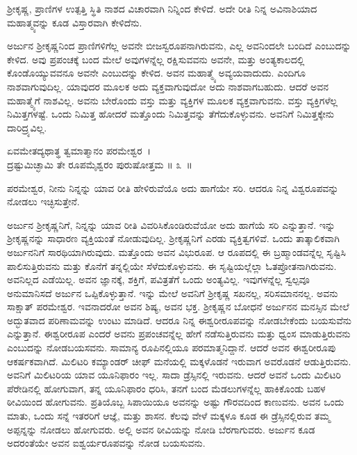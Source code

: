 \begin{artha}
ಶ‍್ರೀಕೃಷ್ಣ, ಪ್ರಾಣಿಗಳ ಉತ್ಪತ್ತಿ ಸ್ಥಿತಿ ನಾಶದ ವಿಚಾರವಾಗಿ ನಿನ್ನಿಂದ ಕೇಳಿದೆ. ಅದೇ ರೀತಿ ನಿನ್ನ ಅವಿನಾಶಿಯಾದ ಮಹಾತ್ಮ್ಯವನ್ನು ಕೂಡ ವಿಸ್ತಾರವಾಗಿ ಕೇಳಿದೆನು.
\end{artha}

ಅರ್ಜುನ ಶ‍್ರೀಕೃಷ್ಣನಿಂದ ಪ್ರಾಣಿಗಳಿಗೆಲ್ಲ ಅವನೇ ಬೀಜಸ್ವರೂಪನಾಗಿರುವನು, ಎಲ್ಲ ಅವನಿಂದಲೇ ಬಂದಿದೆ ಎಂಬುದನ್ನು ಕೇಳಿದ. ಅವು ಪ್ರಪಂಚಕ್ಕೆ ಬಂದ ಮೇಲೆ ಅವುಗಳನ್ನೆಲ್ಲ ರಕ್ಷಿಸುವವನು ಅವನೇ, ಮತ್ತು ಅಂತ್ಯಕಾಲದಲ್ಲಿ ಕೊಂಡೊಯ್ಯುವವನೂ ಅವನೇ ಎಂಬುದನ್ನು ಕೇಳಿದ. ಅವನ ಮಹಾತ್ಮ್ಯೆ ಅವ್ಯಯವಾದುದು. ಎಂದಿಗೂ ನಾಶವಾಗುವುದಿಲ್ಲ. ಯಾವುದರ ಮೂಲಕ ಅದು ವ್ಯಕ್ತವಾಗುವುದೋ ಅದು ನಾಶವಾಗಬಹುದು. ಆದರೆ ಅವನ ಮಹಾತ್ಮ್ಯೆಗೆ ನಾಶವಿಲ್ಲ. ಅವನು ಬೇರೊಂದು ವಸ್ತು ಮತ್ತು ವ್ಯಕ್ತಿಗಳ ಮೂಲಕ ವ್ಯಕ್ತವಾಗುವನು. ವಸ್ತು ವ್ಯಕ್ತಿಗಳೆಲ್ಲ ನಿಮಿತ್ತಗಳಷ್ಟೆ. ಒಂದು ನಿಮಿತ್ತ ಹೋದರೆ ಮತ್ತೊಂದು ನಿಮಿತ್ತವನ್ನು ತೆಗೆದುಕೊಳ್ಳುವನು. ಅವನಿಗೆ ನಿಮಿತ್ತಕ್ಕೇನು ದಾರಿದ್ರ್ಯವಿಲ್ಲ. 

\begin{shloka}
ಏವಮೇತದ್ಯಥಾತ್ಥ ತ್ವಮಾತ್ಮಾನಂ ಪರಮೇಶ್ವರ~।\\ದ್ರಷ್ಟುಮಿಚ್ಛಾಮಿ ತೇ ರೂಪಮೈಶ್ವರಂ ಪುರುಷೋತ್ತಮ \hfill॥ ೩~॥
\end{shloka}

\begin{artha}
ಪರಮೇಶ್ವರ, ನೀನು ನಿನ್ನನ್ನು ಯಾವ ರೀತಿ ಹೇಳಿರುವೆಯೊ ಅದು ಹಾಗೆಯೇ ಸರಿ. ಆದರೂ ನಿನ್ನ ವಿಶ್ವರೂಪವನ್ನು ನೋಡಲು ಇಚ್ಛಿಸುತ್ತೇನೆ.
\end{artha}

ಅರ್ಜುನ ಶ‍್ರೀಕೃಷ್ಣನಿಗೆ, ನಿನ್ನನ್ನು ಯಾವ ರೀತಿ ವಿವರಿಸಿಕೊಂಡಿರುವೆಯೋ ಅದು ಹಾಗೆಯೆ ಸರಿ ಎನ್ನುತ್ತಾನೆ. ಇನ್ನು ಶ‍್ರೀಕೃಷ್ಣನನ್ನು ಸಾಧಾರಣ ವ್ಯಕ್ತಿಯಂತೆ ನೋಡುವುದಿಲ್ಲ. ಶ‍್ರೀಕೃಷ್ಣನಿಗೆ ಎರಡು ವ್ಯಕ್ತಿತ್ವಗಳಿವೆ. ಒಂದು ತಾತ್ಕಾಲಿಕವಾಗಿ ಅರ್ಜುನನಿಗೆ ಸಾರಥಿಯಾಗಿರುವುದು. ಮತ್ತೊಂದು ಅವನ ವಿಭುರೂಪ. ಆ ರೂಪದಲ್ಲಿ ಈ ಬ್ರಹ್ಮಾಂಡವನ್ನೆಲ್ಲ ಸೃಷ್ಟಿಸಿ ಪಾಲಿಸುತ್ತಿರುವನು ಮತ್ತು ಕೊನೆಗೆ ತನ್ನಲ್ಲಿಯೇ ಸೆಳೆದುಕೊಳ್ಳುವನು. ಈ ಸೃಷ್ಟಿಯಲ್ಲೆಲ್ಲಾ ಓತಪ್ರೋತನಾಗಿರುವನು. ಅವ\-ನಿಲ್ಲದ ಎಡೆಯಿಲ್ಲ. ಅವನ ಜ್ಞಾನಕ್ಕೆ, ಶಕ್ತಿಗೆ, ಪವಿತ್ರತೆಗೆ ಒಂದು ಅಂತ್ಯವಿಲ್ಲ. ಇವುಗಳನ್ನೆಲ್ಲ ಸ್ವಲ್ಪವೂ ಅನುಮಾನಿಸದೆ ಅರ್ಜುನ ಒಪ್ಪಿಕೊಳ್ಳುತ್ತಾನೆ. ಇನ್ನು ಮೇಲೆ ಅವನಿಗೆ ಶ‍್ರೀಕೃಷ್ಣ ಸಖನಲ್ಲ, ಸರಿಸಮಾನನಲ್ಲ. ಅವನು ಸಾಕ್ಷಾತ್ ಪರಮೇಶ್ವರ. ಇವನಾದರೋ ಅವನ ಶಿಷ್ಯ, ಅವನ ಭಕ್ತ. ಶ‍್ರೀಕೃಷ್ಣನ ಬೋಧನೆ ಅರ್ಜುನನ ಮನಸ್ಸಿನ ಮೇಲೆ ಅದ್ಭುತವಾದ ಪರಿಣಾಮವನ್ನು ಉಂಟು ಮಾಡಿದೆ. ಆದರೂ ನಿನ್ನ ಈಶ್ವರೀರೂಪವನ್ನು ನೋಡಬೇಕೆಂದು ಬಯಸುವೆನು ಎನ್ನುತ್ತಾನೆ. ಈಶ್ವರೀರೂಪ ಎಂದರೆ ಅವನು ಪ್ರಪಂಚವನ್ನೆಲ್ಲ ಹೇಗೆ ನಡೆಸುತ್ತಿರುವನು ಮತ್ತು ಧ್ವಂಸ ಮಾಡುತ್ತಿರುವನು ಎಂಬುದನ್ನು ನೋಡಬಯಸವನು. ಸಾಮಾನ್ಯ ರೂಪಿನಲ್ಲಿಯೂ ಪರಮಾತ್ಮನಿದ್ದಾನೆ. ಆದರೆ ಅವನ ಈಶ್ವರೀರೂಪು ಆಕರ್ಷಕವಾಗಿದೆ. ಮಿಲಿಟರಿ ಕಮ್ಯಾಂಡರ್ ಚೀಫ್ ಮನೆಯಲ್ಲಿ ಮಕ್ಕಳೊಡನೆ ಇರುವಾಗ ಅವರೊಡನೆ ಆಡುತ್ತಿರುವನು. ಅವನಿಗೆ ಮಿಲಿಟರಿಯ ಯಾವ ಯೂನಿಫಾರಂ ಇಲ್ಲ. ಸಾದಾ ಡ್ರೆಸ್ಸಿನಲ್ಲಿ ಇರುವನು. ಆದರೆ ಅವನೆ ಒಂದು ಮಿಲಿಟರಿ ಪೆರೇಡಿನಲ್ಲಿ ಹೋಗುವಾಗ, ತನ್ನ ಯೂನಿಫಾರಂ ಧರಿಸಿ, ತನಗೆ ಬಂದ ಮೆಡಲುಗಳನ್ನೆಲ್ಲ ಹಾಕಿಕೊಂಡು ಬಹಳ ಠೀವಿಯಿಂದ ಹೋಗುವನು. ಪ್ರತಿಯೊಬ್ಬ ಸಿಪಾಯಿಯೂ ಅವನನ್ನು ಅಷ್ಟು ಗೌರವದಿಂದ ಕಾಣುವನು. ಅವನ ಒಂದು ಮಾತು, ಒಂದು ಸನ್ನೆ ಇತರರಿಗೆ ಆಜ್ಞೆ, ಮತ್ತು ಶಾಸನ. ಕೆಲವು ವೇಳೆ ಮಕ್ಕಳೂ ಕೂಡ ಈ ಡ್ರೆಸ್ಸಿನಲ್ಲಿರುವ ತಮ್ಮ ಅಪ್ಪನ್ನನ್ನು ನೋಡಲು ಹೋಗುವರು. ಅಲ್ಲಿ ಅವನ ಠೀವಿಯನ್ನು ನೋಡಿ ಬೆರಗಾಗುವರು. ಅರ್ಜುನ ಕೂಡ ಅದರಂತೆಯೇ ಅವನ ಐಶ್ವರ್ಯರೂಪವನ್ನು ನೋಡ ಬಯಸುವನು.

